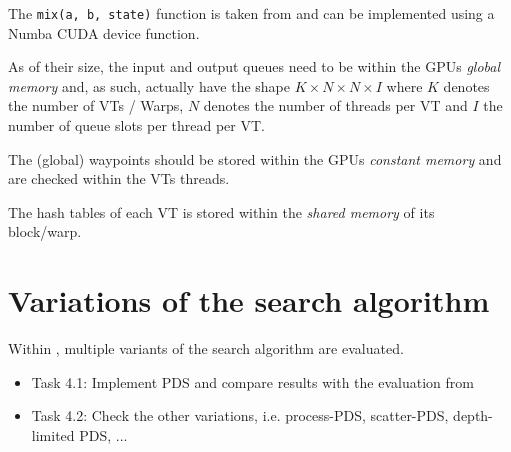 \documentclass[a4paper]{scrartcl}
\begin{document}
The \texttt{mix(a, b, state)} function is taken from \cite{Jenkins.Hash} and can be implemented using a Numba CUDA device function.

As of their size, the input and output queues need to be within the GPUs \emph{global memory} and, as such, actually have the shape $K \times N \times N \times I$ where $K$ denotes the number of VTs / Warps, $N$ denotes the number of threads per VT and $I$ the number of queue slots per thread per VT.

The (global) waypoints should be stored within the GPUs \emph{constant memory} and are checked within the VTs threads.

The hash tables of each VT is stored within the \emph{shared memory} of its block/warp.


\section{Variations of the search algorithm}

Within \cite{DeFrancisco2020.Grapple}, multiple variants of the search algorithm are evaluated.

\begin{itemize}
    \item Task 4.1: Implement PDS and compare results with the evaluation from \cite{DeFrancisco2020.Grapple}
    \item Task 4.2: Check the other variations, i.e. process-PDS, scatter-PDS, depth-limited PDS, ...
\end{itemize}


\printbibliography[heading=bibintoc]
\end{document}
